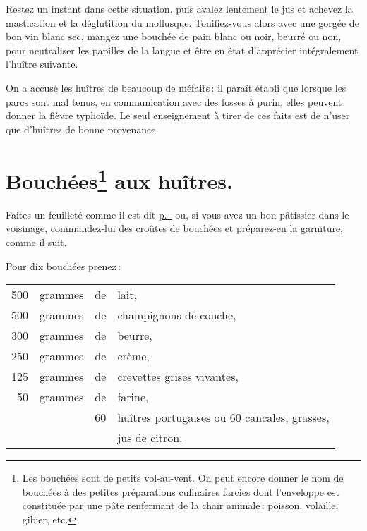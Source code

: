 Restez un instant dans cette situation. puis avalez lentement le jus et achevez
la mastication et la déglutition du mollusque. Tonifiez-vous alors avec une
gorgée de bon vin blanc sec, mangez une bouchée de pain blanc ou noir, beurré
ou non, pour neutraliser les papilles de la langue et être en état d'apprécier
intégralement l'huître suivante.

\sk

On a accusé les huîtres de beaucoup de méfaits : il paraît établi que lorsque
les parcs sont mal tenus, en communication avec des fosses à purin, elles
peuvent donner la fièvre typhoïde. Le seul enseignement à tirer de ces faits
est de n'user que d'huîtres de bonne provenance.

\section*{\centering Bouchées\footnote{
Les bouchées sont de petits vol-au-vent. On peut encore donner le nom de
bouchées à des petites préparations culinaires farcies dont l'enveloppe est
constituée par une pâte renfermant de la chair animale : poisson, volaille,
gibier, etc.} aux huîtres.}


Faites un feuilleté comme il est dit \hyperlink{p0319}{p. \pageref{pg0319}} ou, si
vous avez un bon pâtissier dans le voisinage, commandez-lui des croûtes de
bouchées et préparez-en la garniture, comme il suit.

\medskip

Pour dix bouchées prenez :

\medskip

\footnotesize
\begin{longtable}{rrrp{16em}}
  500 & grammes    & de & lait,                                                                           \\
  500 & grammes    & de & champignons de couche,                                                          \\
  300 & grammes    & de & beurre,                                                                         \\
  250 & grammes    & de & crème,                                                                          \\
  125 & grammes    & de & crevettes grises vivantes,                                                      \\
   50 & grammes    & de & farine,                                                                         \\
      &            & 60 & huîtres portugaises ou 60 cancales, grasses,                                    \\
      &            &    & jus de citron.                                                                  \\
\end{longtable}
\normalsize

